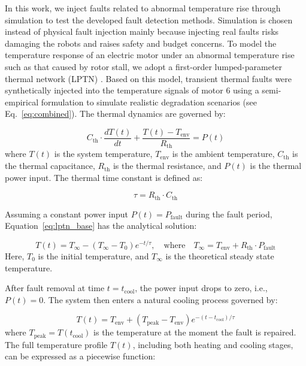 \documentclass[a4paper,10pt]{cas-sc}%
\newcommand{\rev}[1]{\textcolor{revisionred}{#1}}
\begin{document}
\rev{In this work, we inject faults related to abnormal temperature rise through simulation to test the developed fault detection methods. Simulation is chosen instead of physical fault injection mainly because injecting real faults risks damaging the robots and raises safety and budget concerns. To model the temperature response of an electric motor under an abnormal temperature rise such as that caused by rotor stall, we adopt a first-order lumped-parameter thermal network (LPTN) \citep{khalesidoost2022overview, sciascera2017analytical, boglietti2009evolution, ramarathnam2015review}.} Based on this model, transient thermal faults were synthetically injected into the temperature signals of motor 6 using a semi-empirical formulation to simulate realistic degradation scenarios (see Eq.~\eqref{eq:combined}). The thermal dynamics are governed by:

\begin{equation}
	C_{\mathrm{th}} \cdot \frac{dT(t)}{dt} + \frac{T(t) - T_{\mathrm{env}}}{R_{\mathrm{th}}} = P(t)
	\label{eq:lptn_base}
\end{equation}
where \( T(t) \) is the system temperature, \( T_{\mathrm{env}} \) is the ambient temperature, \( C_{\mathrm{th}} \) is the thermal capacitance, \( R_{\mathrm{th}} \) is the thermal resistance, and \( P(t) \) is the thermal power input. The thermal time constant is defined as:

\[
	\tau = R_{\mathrm{th}} \cdot C_{\mathrm{th}}
\]

Assuming a constant power input \( P(t) = P_{\mathrm{fault}} \) during the fault period, Equation~\eqref{eq:lptn_base} has the analytical solution:

\begin{equation}
	T(t) = T_{\infty} - \left( T_{\infty} - T_0 \right) e^{-t/\tau}, \quad \text{where} \quad T_{\infty} = T_{\mathrm{env}} + R_{\mathrm{th}} \cdot P_{\mathrm{fault}}
	\label{eq:heating}
\end{equation}
Here, \( T_0 \) is the initial temperature, and \( T_{\infty} \) is the theoretical steady state temperature.

After fault removal at time \( t = t_{\mathrm{cool}} \), the power input drops to zero, i.e., \( P(t) = 0 \). The system then enters a natural cooling process governed by:

\begin{equation}
	T(t) = T_{\mathrm{env}} + \left( T_{\mathrm{peak}} - T_{\mathrm{env}} \right) e^{-(t - t_{\mathrm{cool}})/\tau}
	\label{eq:cooling}
\end{equation}
where \( T_{\mathrm{peak}} = T(t_{\mathrm{cool}}) \) is the temperature at the moment the fault is repaired. The full temperature profile \( T(t) \), including both heating and cooling stages, can be expressed as a piecewise function:
\end{document}
